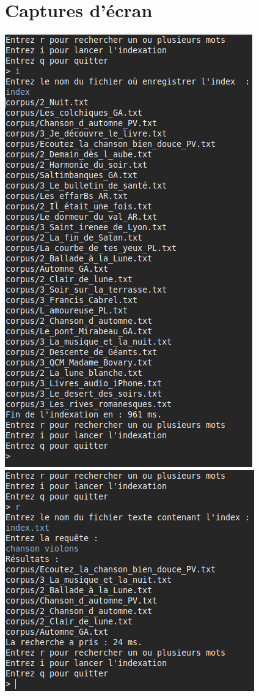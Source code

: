 \documentclass{article}
\begin{document}
\section{Captures d'écran}
\begin{center}
     \includegraphics[scale=0.4]{../data/index.png}\hfill
     \includegraphics[scale=0.4]{../data/recherche-screen.png}
\end{center}
\end{document}
